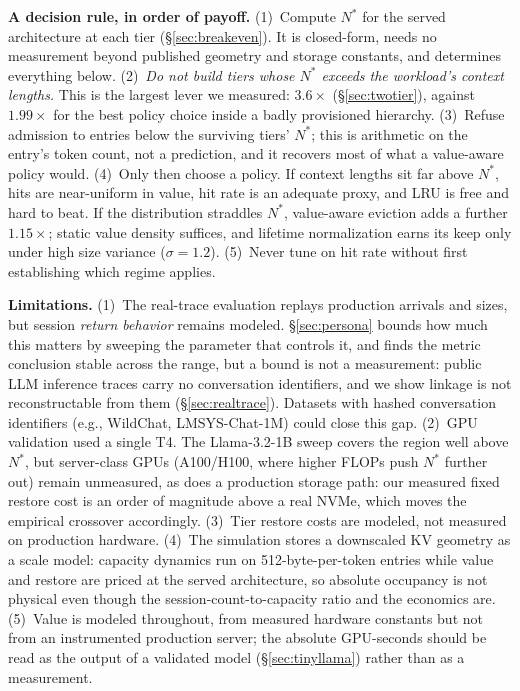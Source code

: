 \documentclass[letterpaper,twocolumn,10pt]{article}
\begin{document}
\textbf{A decision rule, in order of payoff.} (1)~Compute $N^{*}$ for the served architecture at each tier (\S\ref{sec:breakeven}). It is closed-form, needs no measurement beyond published geometry and storage constants, and determines everything below. (2)~\emph{Do not build tiers whose $N^{*}$ exceeds the workload's context lengths.} This is the largest lever we measured: $3.6\times$ (\S\ref{sec:twotier}), against $1.99\times$ for the best policy choice inside a badly provisioned hierarchy. (3)~Refuse admission to entries below the surviving tiers' $N^{*}$; this is arithmetic on the entry's token count, not a prediction, and it recovers most of what a value-aware policy would. (4)~Only then choose a policy. If context lengths sit far above $N^{*}$, hits are near-uniform in value, hit rate is an adequate proxy, and LRU is free and hard to beat. If the distribution straddles $N^{*}$, value-aware eviction adds a further $1.15\times$; static value density suffices, and lifetime normalization earns its keep only under high size variance ($\sigma{=}1.2$). (5)~Never tune on hit rate without first establishing which regime applies.

\textbf{Limitations.} (1)~The real-trace evaluation replays production arrivals and sizes, but session \emph{return behavior} remains modeled. \S\ref{sec:persona} bounds how much this matters by sweeping the parameter that controls it, and finds the metric conclusion stable across the range, but a bound is not a measurement: public LLM inference traces carry no conversation identifiers, and we show linkage is not reconstructable from them (\S\ref{sec:realtrace}). Datasets with hashed conversation identifiers (e.g., WildChat, LMSYS-Chat-1M) could close this gap. (2)~GPU validation used a single T4. The Llama-3.2-1B sweep covers the region well above $N^{*}$, but server-class GPUs (A100/H100, where higher FLOPs push $N^{*}$ further out) remain unmeasured, as does a production storage path: our measured fixed restore cost is an order of magnitude above a real NVMe, which moves the empirical crossover accordingly. (3)~Tier restore costs are modeled, not measured on production hardware. (4)~The simulation stores a downscaled KV geometry as a scale model: capacity dynamics run on 512-byte-per-token entries while value and restore are priced at the served architecture, so absolute occupancy is not physical even though the session-count-to-capacity ratio and the economics are. (5)~Value is modeled throughout, from measured hardware constants but not from an instrumented production server; the absolute GPU-seconds should be read as the output of a validated model (\S\ref{sec:tinyllama}) rather than as a measurement.
\end{document}
